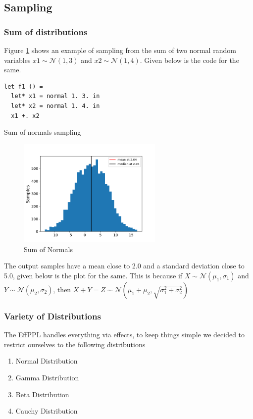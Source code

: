 \documentclass[a4paper,11pt]{article}
\theoremstyle{mytheor}
\begin{document}
    \subsection{Sampling}
    \subsubsection{Sum of distributions}
    Figure \ref{norm_sampling} shows an example of sampling from the sum of two normal random variables $ x1 \sim \mathcal{N}(1,3)$ and $x2 \sim \mathcal{N}(1,4)$. Given below is the code for the same.

\begin{listing}[H]\centering
\begin{verbatim}
let f1 () = 
  let* x1 = normal 1. 3. in
  let* x2 = normal 1. 4. in
  x1 +. x2
\end{verbatim}

\caption{Sum of normals sampling}
\end{listing}

\begin{figure}[H]
    \centering
    \includegraphics[width=7cm]{sampling/sum_of_normals_samplingc.png}
    \caption{Sum of Normals}
    \label{norm_sampling}
\end{figure}

The output samples have a mean close to 2.0 and a standard deviation close to 5.0, given below is the plot for the same. This is because if $X \sim \mathcal{N}(\mu_1, \sigma_1)$ and $Y \sim \mathcal{N}(\mu_2, \sigma_2)$, then
$X+Y = Z \sim  \mathcal{N}(\mu_1+\mu_2, \sqrt{\sigma^2_1+\sigma^2_2})$


    \subsubsection{Variety of Distributions}\label{vardist}
    
    The EffPPL handles everything via effects, to keep things simple we decided to restrict ourselves to the following distributions
    \begin{enumerate}
        \item Normal Distribution
        \item Gamma Distribution
        \item Beta Distribution
        \item Cauchy Distribution
    \end{enumerate}
    
\end{document}
